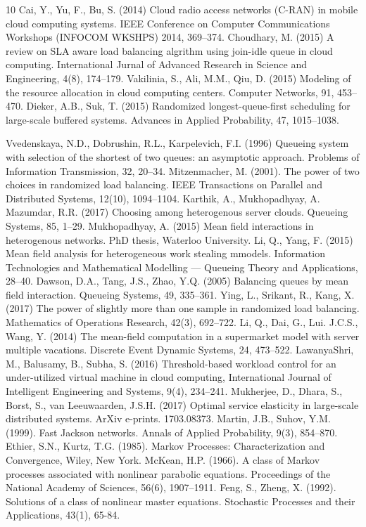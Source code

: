 \documentclass[12pt]{article}
\begin{document}
\begin{thebibliography}{10}
\renewcommand{\baselinestretch}{1.1}
\setlength{\itemsep}{-1mm} \small
{} Cai, Y., Yu, F., Bu, S. (2014) Cloud radio access networks (C-RAN) in mobile cloud computing systems. IEEE Conference on Computer Communications Workshops (INFOCOM WKSHPS) 2014, 369--374.
 Choudhary, M. (2015) A review on SLA aware load balancing algrithm using join-idle queue in cloud computing. International Jurnal of Advanced Research in Science and Engineering, 4(8), 174--179.
 Vakilinia, S., Ali, M.M., Qiu, D. (2015) Modeling of the resource allocation in cloud computing centers. Computer Networks, 91, 453--470.
 Dieker, A.B., Suk, T. (2015) Randomized longest-queue-first scheduling for large-scale buffered systems. Advances in Applied Probability, 47, 1015--1038.

 Vvedenskaya, N.D., Dobrushin, R.L., Karpelevich, F.I. (1996) Queueing system with selection of the shortest of two queues: an asymptotic approach. Problems of Information Transmission, 32, 20--34.
 Mitzenmacher, M. (2001). The power of two choices in randomized load balancing. IEEE Transactions on Parallel and Distributed Systems, 12(10), 1094--1104.
 Karthik, A., Mukhopadhyay, A. Mazumdar, R.R. (2017) Choosing among heterogenous server clouds. Queueing Systems, 85, 1--29.
 Mukhopadhyay, A. (2015) Mean field interactions in heterogenous networks. PhD thesis, Waterloo University.
 Li, Q., Yang, F. (2015) Mean field analysis for heterogeneous work stealing mmodels. Information Technologies and Mathematical Modelling --- Queueing Theory and Applications, 28--40.
 Dawson, D.A., Tang, J.S., Zhao, Y.Q. (2005) Balancing queues by mean field interaction. Queueing Systems, 49, 335--361.
 Ying, L., Srikant, R., Kang, X. (2017) The power of slightly more than one sample in randomized load balancing. Mathematics of Operations Research, 42(3), 692--722.
 Li, Q., Dai, G., Lui. J.C.S., Wang, Y. (2014) The mean-field computation in a supermarket
model with server multiple vacations. Discrete Event Dynamic Systems, 24, 473--522.
 LawanyaShri, M., Balusamy, B., Subha, S. (2016) Threshold-based workload control for an under-utilized virtual machine in cloud computing, International Journal of Intelligent Engineering and Systems, 9(4), 234--241.
 Mukherjee, D., Dhara, S., Borst, S., van Leeuwaarden, J.S.H. (2017) Optimal service elasticity in large-scale distributed systems. ArXiv e-prints. 1703.08373.
 Martin, J.B., Suhov, Y.M. (1999). Fast Jackson networks. Annals of Applied Probability, 9(3), 854--870.
 Ethier, S.N., Kurtz, T.G. (1985). Markov Processes: Characterization and Convergence, Wiley, New York.
 McKean, H.P. (1966). A class of Markov processes associated with nonlinear parabolic equations. Proceedings of the National Academy of Sciences, 56(6), 1907--1911.
 Feng, S., Zheng, X. (1992). Solutions of a class of nonlinear master equations. Stochastic Processes and their Applications, 43(1), 65-84.


\end{thebibliography}
\end{document}
